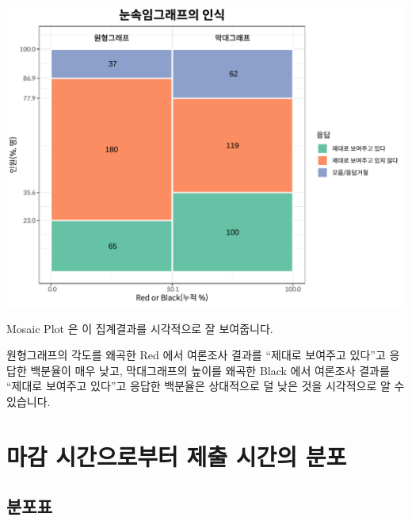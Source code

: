 \documentclass[
]{book}
\begin{document}
\includegraphics{Quiz_report_2025_files/figure-latex/unnamed-chunk-37-1.pdf}

Mosaic Plot 은 이 집계결과를 시각적으로 잘 보여줍니다.

원형그래프의 각도를 왜곡한 Red 에서 여론조사 결과를 ``제대로 보여주고 있다''고 응답한 백분율이 매우 낮고, 막대그래프의 높이를 왜곡한 Black 에서 여론조사 결과를 ``제대로 보여주고 있다''고 응답한 백분율은 상대적으로 덜 낮은 것을 시각적으로 알 수 있습니다.

\section{마감 시간으로부터 제출 시간의 분포}\label{uxb9c8uxac10-uxc2dcuxac04uxc73cuxb85cuxbd80uxd130-uxc81cuxcd9c-uxc2dcuxac04uxc758-uxbd84uxd3ec-1}

\subsection{분포표}\label{uxbd84uxd3ecuxd45c-1}
\end{document}
